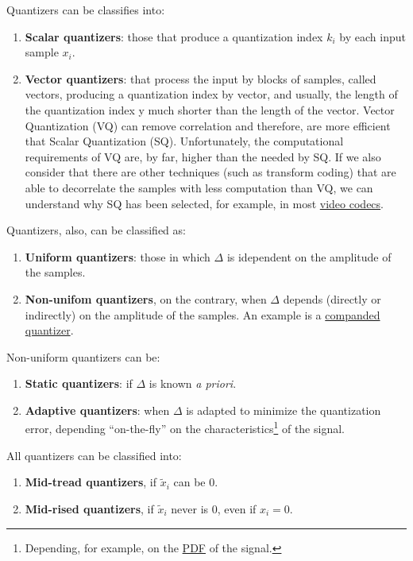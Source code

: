 Quantizers can be classifies into:
\begin{enumerate}
\item \textbf{Scalar quantizers}: those that produce a quantization
  index $k_i$ by each input sample $x_i$.
\item \textbf{Vector quantizers}: that process the input by blocks of
  samples, called vectors, producing a quantization index by vector,
  and usually, the length of the quantization index y much shorter
  than the length of the vector. Vector Quantization (VQ) can remove
  correlation and therefore, are more efficient that Scalar
  Quantization (SQ). Unfortunately, the computational requirements of VQ
  are, by far, higher than the needed by SQ. If we also consider that
  there are other techniques (such as transform coding) that are able
  to decorrelate the samples with less computation than VQ, we can
  understand why SQ has been selected, for example, in
  most \href{https://en.wikipedia.org/wiki/Video_coding_format}{video
  codecs}.
\end{enumerate}

Quantizers, also, can be classified as:
\begin{enumerate}
\item \textbf{Uniform quantizers}: those in which $\Delta$ is
  idependent on the amplitude of the samples.
\item \textbf{Non-unifom quantizers}, on the contrary, when $\Delta$
  depends (directly or indirectly) on the amplitude of the samples. An
  example is a
  \href{https://en.wikipedia.org/wiki/Companding}{companded
    quantizer}.
\end{enumerate}

Non-uniform quantizers can be:
\begin{enumerate}
\item \textbf{Static quantizers}: if $\Delta$ is known \emph{a
priori}.
\item \textbf{Adaptive quantizers}: when $\Delta$ is adapted to
  minimize the quantization error, depending ``on-the-fly'' on the
  characteristics\footnote{Depending, for example, on the
    \href{https://en.wikipedia.org/wiki/Probability_density_function}{PDF}
    of the signal.} of the signal.
\end{enumerate}

All quantizers can be classified into:
\begin{enumerate}
\item \textbf{Mid-tread quantizers}, if $\tilde{x}_i$ can be $0$.
\item \textbf{Mid-rised quantizers}, if $\tilde{x}_i$ never is $0$,
  even if $x_i=0$.
\end{enumerate}

